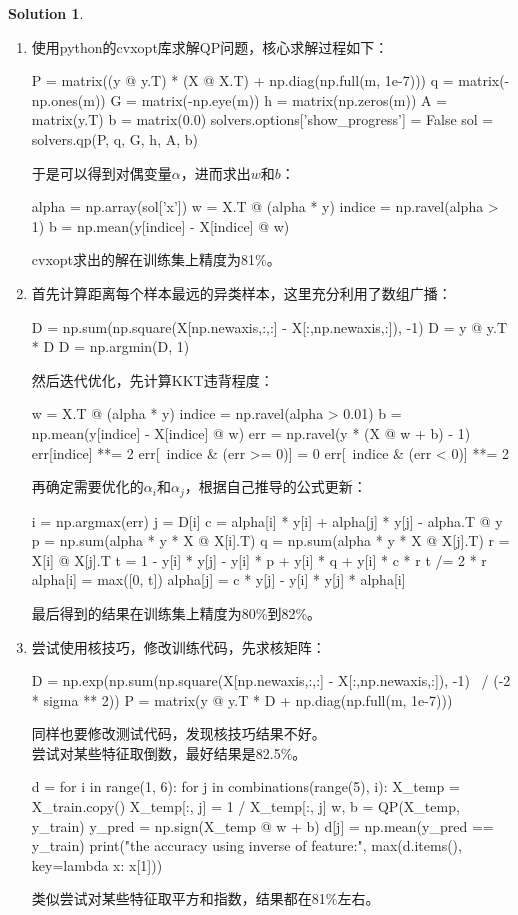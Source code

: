 \documentclass[a4paper,UTF8]{article}
\theoremstyle{definition}
\newtheorem*{solution}{Solution}
\begin{document}
\begin{solution}
	~\\
	\begin{enumerate}[(1)]
	\item 
	使用python的cvxopt库求解QP问题，核心求解过程如下：
\begin{python}
	P = matrix((y @ y.T) * (X @ X.T) + np.diag(np.full(m, 1e-7)))
	q = matrix(-np.ones(m))
	G = matrix(-np.eye(m))
	h = matrix(np.zeros(m))
	A = matrix(y.T)
	b = matrix(0.0)
	solvers.options['show_progress'] = False
	sol = solvers.qp(P, q, G, h, A, b)
\end{python}
	于是可以得到对偶变量$\alpha$，进而求出$w$和$b$：
\begin{python}
	alpha = np.array(sol['x'])
	w = X.T @ (alpha * y)
	indice = np.ravel(alpha > 1)
	b = np.mean(y[indice] - X[indice] @ w)
\end{python}
	cvxopt求出的解在训练集上精度为81\%。
	\item 
	首先计算距离每个样本最远的异类样本，这里充分利用了数组广播：
\begin{python}
	D = np.sum(np.square(X[np.newaxis,:,:] - X[:,np.newaxis,:]), -1)
	D = y @ y.T * D
	D = np.argmin(D, 1)
\end{python}
	然后迭代优化，先计算KKT违背程度：
\begin{python}
	w = X.T @ (alpha * y)
	indice = np.ravel(alpha > 0.01)
	b = np.mean(y[indice] - X[indice] @ w)
	err = np.ravel(y * (X @ w + b) - 1)
	err[indice] **= 2
	err[~indice & (err >= 0)] = 0
	err[~indice & (err < 0)] **= 2
\end{python}
	再确定需要优化的$\alpha_i$和$\alpha_j$，根据自己推导的公式更新：
\begin{python}
	i = np.argmax(err)
	j = D[i]
	c = alpha[i] * y[i] + alpha[j] * y[j] - alpha.T @ y
	p = np.sum(alpha * y * X @ X[i].T)
	q = np.sum(alpha * y * X @ X[j].T)
	r = X[i] @ X[j].T
	t = 1 - y[i] * y[j] - y[i] * p + y[i] * q + y[i] * c * r
	t /= 2 * r
	alpha[i] = max([0, t])
	alpha[j] = c * y[j] - y[i] * y[j] * alpha[i]
\end{python}
	最后得到的结果在训练集上精度为80\%到82\%。
	\item 
	尝试使用核技巧，修改训练代码，先求核矩阵：
\begin{python}
	D = np.exp(np.sum(np.square(X[np.newaxis,:,:] - X[:,np.newaxis,:]), -1) \
			/ (-2 * sigma ** 2))
	P = matrix(y @ y.T * D + np.diag(np.full(m, 1e-7)))
\end{python}
	同样也要修改测试代码，发现核技巧结果不好。\\
	尝试对某些特征取倒数，最好结果是82.5\%。
\begin{python}
	d = {}
	for i in range(1, 6):
		for j in combinations(range(5), i):
			X_temp = X_train.copy()
			X_temp[:, j] = 1 / X_temp[:, j]
			w, b = QP(X_temp, y_train)
			y_pred = np.sign(X_temp @ w + b)
			d[j] = np.mean(y_pred == y_train)
	print("the accuracy using inverse of feature:", max(d.items(), key=lambda x: x[1]))
\end{python}
	类似尝试对某些特征取平方和指数，结果都在81\%左右。
	\end{enumerate}
\end{solution}
\end{document}
